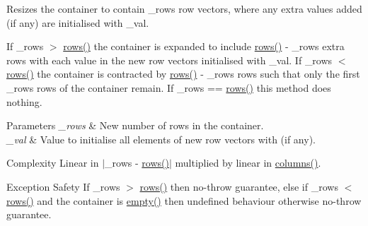 Resizes the container to contain {\ttfamily \+\_\+rows} row vectors, where any extra values added (if any) are initialised with {\ttfamily \+\_\+val}. 

If {\ttfamily \+\_\+rows $>$ \hyperlink{classcrsc_1_1dynamic__matrix_a5d167a31d3be0ac09d3abdf57a11832d}{rows()}} the container is expanded to include {\ttfamily \hyperlink{classcrsc_1_1dynamic__matrix_a5d167a31d3be0ac09d3abdf57a11832d}{rows()} -\/ \+\_\+rows} extra rows with each value in the new row vectors initialised with {\ttfamily \+\_\+val}. If {\ttfamily \+\_\+rows $<$ \hyperlink{classcrsc_1_1dynamic__matrix_a5d167a31d3be0ac09d3abdf57a11832d}{rows()}} the container is contracted by {\ttfamily \hyperlink{classcrsc_1_1dynamic__matrix_a5d167a31d3be0ac09d3abdf57a11832d}{rows()} -\/ \+\_\+rows} rows such that only the first {\ttfamily \+\_\+rows} rows of the container remain. If {\ttfamily \+\_\+rows == \hyperlink{classcrsc_1_1dynamic__matrix_a5d167a31d3be0ac09d3abdf57a11832d}{rows()}} this method does nothing.


\begin{DoxyParams}{Parameters}
{\em \+\_\+rows} & New number of rows in the container. \\
\hline
{\em \+\_\+val} & Value to initialise all elements of new row vectors with (if any). \\
\hline
\end{DoxyParams}
\begin{DoxyParagraph}{Complexity}
Linear in {\ttfamily $\vert$\+\_\+rows -\/ \hyperlink{classcrsc_1_1dynamic__matrix_a5d167a31d3be0ac09d3abdf57a11832d}{rows()}$\vert$} multiplied by linear in {\ttfamily \hyperlink{classcrsc_1_1dynamic__matrix_a43d52d7663b24b2175add500c7650d63}{columns()}}. 
\end{DoxyParagraph}
\begin{DoxyParagraph}{Exception Safety}
If {\ttfamily \+\_\+rows $>$ \hyperlink{classcrsc_1_1dynamic__matrix_a5d167a31d3be0ac09d3abdf57a11832d}{rows()}} then no-\/throw guarantee, else if {\ttfamily \+\_\+rows $<$ \hyperlink{classcrsc_1_1dynamic__matrix_a5d167a31d3be0ac09d3abdf57a11832d}{rows()}} and the container is {\ttfamily \hyperlink{classcrsc_1_1dynamic__matrix_a172206c39c9982863cb435e8d2d1a42e}{empty()}} then undefined behaviour otherwise no-\/throw guarantee. 
\end{DoxyParagraph}
